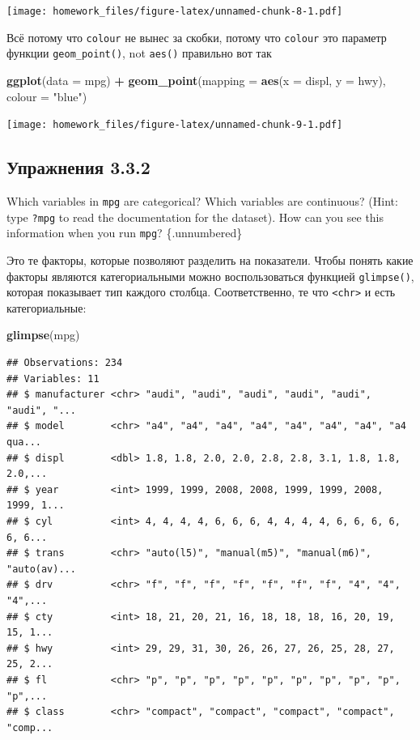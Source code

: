 \documentclass[]{book}
\newenvironment{Shaded}{\begin{snugshade}}{\end{snugshade}}
\newcommand{\KeywordTok}[1]{\textcolor[rgb]{0.13,0.29,0.53}{\textbf{#1}}}
\newcommand{\DataTypeTok}[1]{\textcolor[rgb]{0.13,0.29,0.53}{#1}}
\newcommand{\StringTok}[1]{\textcolor[rgb]{0.31,0.60,0.02}{#1}}
\newcommand{\OperatorTok}[1]{\textcolor[rgb]{0.81,0.36,0.00}{\textbf{#1}}}
\newcommand{\NormalTok}[1]{#1}
\begin{document}
\texttt{[image: homework\_files/figure-latex/unnamed-chunk-8-1.pdf]}

Всё потому что \texttt{colour} не вынес за скобки, потому что
\texttt{colour} это параметр функции \texttt{geom\_point()}, not
\texttt{aes()} правильно вот так

\begin{Shaded}
\begin{Highlighting}[]
\KeywordTok{ggplot}\NormalTok{(}\DataTypeTok{data =}\NormalTok{ mpg) }\OperatorTok{+}
\StringTok{  }\KeywordTok{geom_point}\NormalTok{(}\DataTypeTok{mapping =} \KeywordTok{aes}\NormalTok{(}\DataTypeTok{x =}\NormalTok{ displ, }\DataTypeTok{y =}\NormalTok{ hwy), }\DataTypeTok{colour =} \StringTok{"blue"}\NormalTok{)}
\end{Highlighting}
\end{Shaded}

\texttt{[image: homework\_files/figure-latex/unnamed-chunk-9-1.pdf]}

\subsection*{Упражнения 3.3.2}\label{-3.3.2}

Which variables in \texttt{mpg} are categorical? Which variables are
continuous? (Hint: type \texttt{?mpg} to read the documentation for the
dataset). How can you see this information when you run \texttt{mpg}?
\{.unnumbered\}

Это те факторы, которые позволяют разделить на показатели. Чтобы понять
какие факторы являются категориальными можно воспользоваться функцией
\texttt{glimpse()}, которая показывает тип каждого столбца.
Соответственно, те что \texttt{\textless{}chr\textgreater{}} и есть
категориальные:

\begin{Shaded}
\begin{Highlighting}[]
\KeywordTok{glimpse}\NormalTok{(mpg)}
\end{Highlighting}
\end{Shaded}

\begin{verbatim}
## Observations: 234
## Variables: 11
## $ manufacturer <chr> "audi", "audi", "audi", "audi", "audi", "audi", "...
## $ model        <chr> "a4", "a4", "a4", "a4", "a4", "a4", "a4", "a4 qua...
## $ displ        <dbl> 1.8, 1.8, 2.0, 2.0, 2.8, 2.8, 3.1, 1.8, 1.8, 2.0,...
## $ year         <int> 1999, 1999, 2008, 2008, 1999, 1999, 2008, 1999, 1...
## $ cyl          <int> 4, 4, 4, 4, 6, 6, 6, 4, 4, 4, 4, 6, 6, 6, 6, 6, 6...
## $ trans        <chr> "auto(l5)", "manual(m5)", "manual(m6)", "auto(av)...
## $ drv          <chr> "f", "f", "f", "f", "f", "f", "f", "4", "4", "4",...
## $ cty          <int> 18, 21, 20, 21, 16, 18, 18, 18, 16, 20, 19, 15, 1...
## $ hwy          <int> 29, 29, 31, 30, 26, 26, 27, 26, 25, 28, 27, 25, 2...
## $ fl           <chr> "p", "p", "p", "p", "p", "p", "p", "p", "p", "p",...
## $ class        <chr> "compact", "compact", "compact", "compact", "comp...
\end{verbatim}
\end{document}
